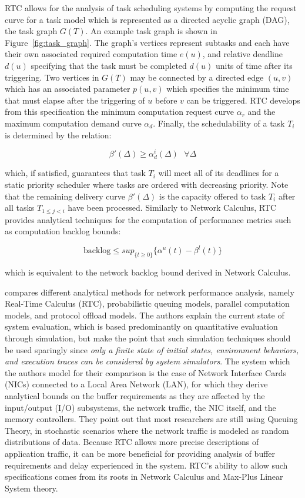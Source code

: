 RTC allows for the analysis of task scheduling systems by computing
the request curve for a task model which is represented as a directed
acyclic graph (DAG), the task graph $G(T)$.  An example task graph is
shown in Figure~\ref{fig:task_graph}.  The graph's vertices represent
subtasks and each have their own associated required computation time
$e(u)$, and relative deadline $d(u)$ specifying that the task must be
completed $d(u)$ units of time after its triggering.  Two vertices in
$G(T)$ may be connected by a directed edge $(u,v)$ which has an
associated parameter $p(u,v)$ which specifies the minimum time that
must elapse after the triggering of $u$ before $v$ can be triggered.
RTC develops from this specification the minimum computation request
curve $\alpha_r$ and the maximum computation demand curve $\alpha_d$.
Finally, the schedulability of a task $T_i$ is determined by the
relation:

\begin{equation}
  \beta'(\Delta)\geq\alpha^i_d(\Delta)\ \ \ \forall\Delta
\end{equation}

which, if satisfied, guarantees that task $T_i$ will meet all of its
deadlines for a static priority scheduler where tasks are ordered with
decreasing priority.  Note that the remaining delivery curve
$\beta'(\Delta)$ is the capacity offered to task $T_i$ after all tasks
$T_{1\leq j<i}$ have been processed. Similarly to Network Calculus,
RTC provides analytical techniques for the computation of performance
metrics such as computation backlog bounds:

\begin{equation}
  \text{backlog}\leq sup_{\{t\geq 0\}}\{\alpha^u(t)-\beta^l(t)\}
\end{equation}

which is equivalent to the network backlog bound derived in Network
Calculus.

\cite{RTCcomparison2011} compares different analytical methods for
network performance analysis, namely Real-Time Calculus (RTC),
probabilistic queuing models, parallel computation models, and
protocol offload models.  The authors explain the current state of
system evaluation, which is based predominantly on quantitative
evaluation through simulation, but make the point that such simulation
techniques should be used sparingly since \textit{only a finite state
of initial states, environment behaviors, and execution traces can
be considered by system simulators}.  The system which the authors
model for their comparison is the case of Network Interface Cards
(NICs) connected to a Local Area Network (LAN), for which they derive
analytical bounds on the buffer requirements as they are affected by
the input/output (I/O) subsystems, the network traffic, the NIC
itself, and the memory controllers.  They point out that most
researchers are still using Queuing Theory, in stochastic scenarios
where the network traffic is modeled as random distributions of data.
Because RTC allows more precise descriptions of application traffic,
it can be more beneficial for providing analysis of buffer
requirements and delay experienced in the system.  RTC's ability to
allow such specifications comes from its roots in Network Calculus and
Max-Plus Linear System theory.

